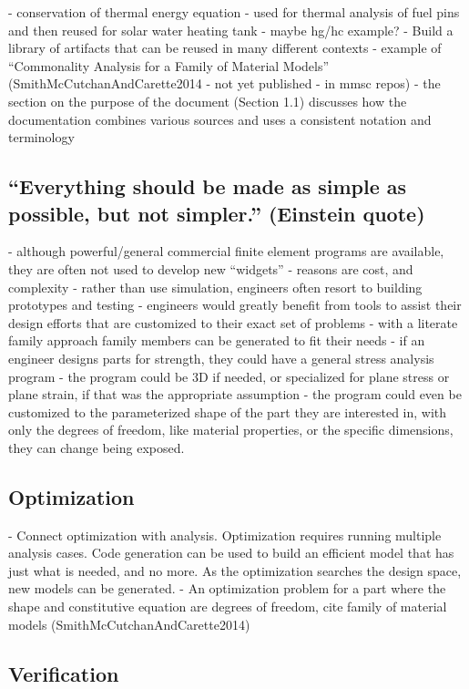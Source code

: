 \documentclass[10pt, preprint]{sigplanconf}
\begin{document}
- conservation of thermal energy equation - used for thermal analysis of fuel pins and then reused for solar water heating tank
- maybe hg/hc example?
- Build a library of artifacts that can be reused in many different contexts
- example of “Commonality Analysis for a Family of Material Models” (SmithMcCutchanAndCarette2014 - not yet published - in mmsc repos) - the section on the purpose of the document (Section 1.1) discusses how the documentation combines various sources and uses a consistent notation and terminology

\subsection{``Everything should be made as simple as possible, but not simpler.'' (Einstein quote)}
\label{subsec:everything}

- although powerful/general commercial finite element programs are available, they are often not used to develop new “widgets”
- reasons are cost, and complexity
- rather than use simulation, engineers often resort to building prototypes and testing
- engineers would greatly benefit from tools to assist their design efforts that are customized to their exact set of problems - with a literate family approach family members can be generated to fit their needs
- if an engineer designs parts for strength, they could have a general stress analysis program - the program could be 3D if needed, or specialized for plane stress or plane strain, if that was the appropriate assumption - the program could even be customized to the parameterized shape of the part they are interested in, with only the degrees of freedom, like material properties, or the specific dimensions, they can change being exposed.

\subsection{Optimization}
\label{subsec:optimization}

- Connect optimization with analysis.  Optimization requires running multiple analysis cases.  Code generation can be used to build an efficient model that has just what is needed, and no more.  As the optimization searches the design space, new models can be generated.
- An optimization problem for a part where the shape and constitutive equation are degrees of freedom, cite family of material models (SmithMcCutchanAndCarette2014)

\subsection{Verification}
\label{subsec:verification}
\end{document}
